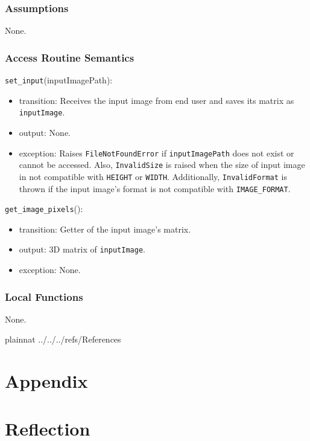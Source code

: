 \documentclass[12pt, titlepage]{article}
\def\code#1{\texttt{#1}}
\begin{document}
\subsubsection{Assumptions}
None.

\subsubsection{Access Routine Semantics}

\noindent \code{set\_input}(inputImagePath):
\begin{itemize}
  \item transition: Receives the input image from end user and saves its matrix as \code{inputImage}.
  \item output: None.
  \item exception: Raises \code{FileNotFoundError} if \code{inputImagePath} does not exist or cannot be accessed. 
  Also, \code{InvalidSize} is raised when the size of input image in not compatible with \code{HEIGHT} or 
  \code{WIDTH}. Additionally, \code{InvalidFormat} is thrown if the input image's format is 
  not compatible with \code{IMAGE\_FORMAT}.
\end{itemize}

\noindent \code{get\_image\_pixels}():
\begin{itemize}
  \item transition: Getter of the input image's matrix.
  \item output: 3D matrix of \code{inputImage}.
  \item exception: None.
\end{itemize}


\subsubsection{Local Functions}
None.



\newpage

 {plainnat}
 {../../../refs/References}

\newpage

\section{Appendix} \label{Appendix}


\section{Reflection}
\end{document}
